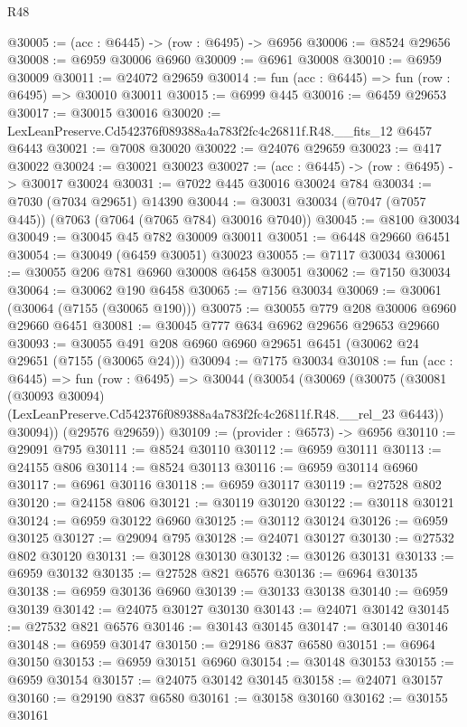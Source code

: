 \begin{lexlean}{R48}
\begin{coremodule}
@30005 := (acc : @6445) -> (row : @6495) -> @6956
@30006 := @8524 @29656
@30008 := @6959 @30006 @6960
@30009 := @6961 @30008
@30010 := @6959 @30009
@30011 := @24072 @29659
@30014 := fun (acc : @6445) => fun (row : @6495) => @30010 @30011
@30015 := @6999 @445
@30016 := @6459 @29653
@30017 := @30015 @30016
@30020 := LexLeanPreserve.Cd542376f089388a4a783f2fc4c26811f.R48.__fits_12 @6457 @6443
@30021 := @7008 @30020
@30022 := @24076 @29659
@30023 := @417 @30022
@30024 := @30021 @30023
@30027 := (acc : @6445) -> (row : @6495) -> @30017 @30024
@30031 := @7022 @445 @30016 @30024 @784
@30034 := @7030 (@7034 @29651) @14390
@30044 := @30031 @30034 (@7047 (@7057 @445)) (@7063 (@7064 (@7065 @784) @30016 @7040))
@30045 := @8100 @30034
@30049 := @30045 @45 @782 @30009 @30011
@30051 := @6448 @29660 @6451
@30054 := @30049 (@6459 @30051) @30023
@30055 := @7117 @30034
@30061 := @30055 @206 @781 @6960 @30008 @6458 @30051
@30062 := @7150 @30034
@30064 := @30062 @190 @6458
@30065 := @7156 @30034
@30069 := @30061 (@30064 (@7155 (@30065 @190)))
@30075 := @30055 @779 @208 @30006 @6960 @29660 @6451
@30081 := @30045 @777 @634 @6962 @29656 @29653 @29660
@30093 := @30055 @491 @208 @6960 @6960 @29651 @6451 (@30062 @24 @29651 (@7155 (@30065 @24)))
@30094 := @7175 @30034
@30108 := fun (acc : @6445) =>
  fun (row : @6495) =>
  @30044
    (@30054
      (@30069
        (@30075
          (@30081
            (@30093 @30094)
            (LexLeanPreserve.Cd542376f089388a4a783f2fc4c26811f.R48.__rel_23 @6443))
          @30094))
      (@29576 @29659))
@30109 := (provider : @6573) -> @6956
@30110 := @29091 @795
@30111 := @8524 @30110
@30112 := @6959 @30111
@30113 := @24155 @806
@30114 := @8524 @30113
@30116 := @6959 @30114 @6960
@30117 := @6961 @30116
@30118 := @6959 @30117
@30119 := @27528 @802
@30120 := @24158 @806
@30121 := @30119 @30120
@30122 := @30118 @30121
@30124 := @6959 @30122 @6960
@30125 := @30112 @30124
@30126 := @6959 @30125
@30127 := @29094 @795
@30128 := @24071 @30127
@30130 := @27532 @802 @30120
@30131 := @30128 @30130
@30132 := @30126 @30131
@30133 := @6959 @30132
@30135 := @27528 @821 @6576
@30136 := @6964 @30135
@30138 := @6959 @30136 @6960
@30139 := @30133 @30138
@30140 := @6959 @30139
@30142 := @24075 @30127 @30130
@30143 := @24071 @30142
@30145 := @27532 @821 @6576
@30146 := @30143 @30145
@30147 := @30140 @30146
@30148 := @6959 @30147
@30150 := @29186 @837 @6580
@30151 := @6964 @30150
@30153 := @6959 @30151 @6960
@30154 := @30148 @30153
@30155 := @6959 @30154
@30157 := @24075 @30142 @30145
@30158 := @24071 @30157
@30160 := @29190 @837 @6580
@30161 := @30158 @30160
@30162 := @30155 @30161

\end{coremodule}
\end{lexlean}
